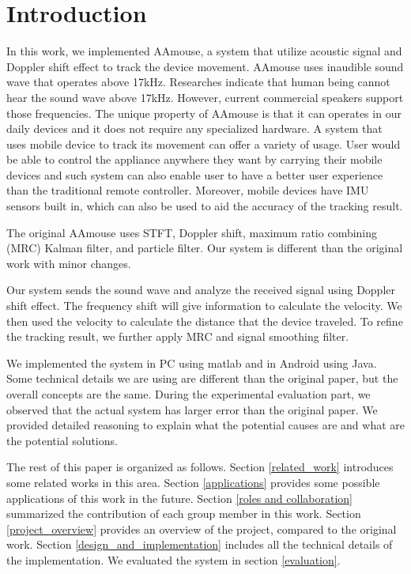 \documentclass{acm_proc_article-sp}
\begin{document}
\section{Introduction}
In this work, we implemented AAmouse, a system that utilize 
acoustic signal and Doppler shift effect to track the device movement.
AAmouse uses inaudible sound wave that operates above 17kHz.
Researches indicate that human being cannot hear the sound wave above
17kHz. However, current commercial speakers support those frequencies.
The unique property of AAmouse is that it can operates in our daily 
devices and it does not require any specialized hardware. A system
that uses mobile device to track its movement can offer a variety
of usage. User would be able to control the appliance anywhere they
want by carrying their mobile devices and such system can also 
enable user to have a better user experience than the traditional
remote controller. Moreover, mobile devices have IMU sensors built in,
which can also be used to aid the accuracy of the tracking result.

The original AAmouse uses STFT, Doppler shift, maximum ratio 
combining (MRC) Kalman filter, and 
particle filter. Our system is different than the original work with
minor changes. 

Our system sends the sound wave and analyze the received signal using
Doppler shift effect. The frequency shift will give information to 
calculate the velocity. We then used the velocity to calculate the
distance that the device traveled. To refine the tracking result,
we further apply MRC and signal smoothing
filter. 

We implemented the system in PC using matlab and in Android using
Java. Some technical details we are using are different than the 
original paper, but the overall concepts are the same. During the 
experimental evaluation part, we observed that the actual system has
larger error than the original paper.
We provided detailed
reasoning to explain what the potential causes are and what are the
potential solutions.

The rest of this paper is organized as follows. Section
\ref{related_work} introduces some related works in this area.
Section \ref{applications} provides some possible applications of
this work in the future. Section \ref{roles and collaboration}
summarized the contribution of each group member in this work. 
Section \ref{project_overview} provides an overview of the project,
compared to the original work. Section \ref{design_and_implementation}
includes all the technical details of the implementation. We evaluated
the system in section \ref{evaluation}.
\end{document}
